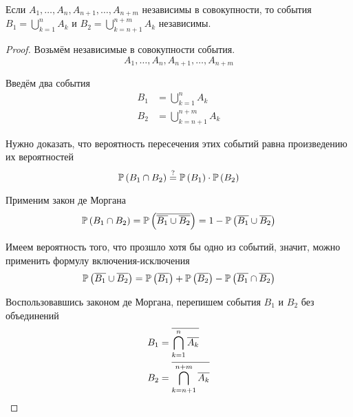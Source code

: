 \begin{affirmation}
    Если $A_1, \dots, A_n, A_{n+1}, \dots, A_{n+m}$ независимы в совокупности,
    то события
    $B_1=\bigcup_{k=1}^n A_k$ и $B_2=\bigcup_{k=n+1}^{n+m} A_k$ независимы.
\end{affirmation}
\begin{proof}
    Возьмём независимые в совокупности события.
    $$A_1, \dots, A_n, A_{n+1}, \dots, A_{n+m}$$
    
    Введём два события
    \begin{align*}
    B_1&=\bigcup_{k=1}^n A_k\\
    B_2&=\bigcup_{k=n+1}^{n+m} A_k
    \end{align*}

    Нужно доказать, что вероятность пересечения этих событий
    равна произведению их вероятностей
    \begin{equation}\label{eq:main_unions}
    \mathbb{P}\left( B_1\cap B_2 \right)
        \stackrel{\rm ?}{=}\mathbb{P}\left( B_1 \right)\cdot\mathbb{P}\left( B_2 \right)
    \end{equation}

    Применим закон де Моргана
    \begin{equation}\label{eq:de_morgan_result}
    \mathbb{P}\left( B_1\cap B_2 \right)
    =\mathbb{P}\left( \overline{\overline{B_1}\cup \overline{B_2}} \right)
    =1-\mathbb{P}\left( {\overline{B_1}\cup \overline{B_2}} \right)
    \end{equation}

    Имеем вероятность того, что прозшло хотя бы одно из событий,
    значит, можно применить формулу включения-исключения
    \begin{equation}\label{eq:incl_excl_result}
    \mathbb{P}\left( \overline{B_1}\cup \overline{B_2} \right)
    =\mathbb{P}\left( \overline{B_1} \right)+\mathbb{P}\left( \overline{B_2} \right)
        -\mathbb{P}\left( \overline{B_1}\cap \overline{B_2} \right)
    \end{equation}

    Воспользовавшись законом де Моргана,
    перепишем события $B_1$ и $B_2$ без объединений
    \begin{align*}
    B_1&=\overline{\bigcap_{k=1}^n \overline{A_k}}\\
    B_2&=\overline{\bigcap_{k=n+1}^{n+m} \overline{A_k}}
    \end{align*}


\end{proof}
